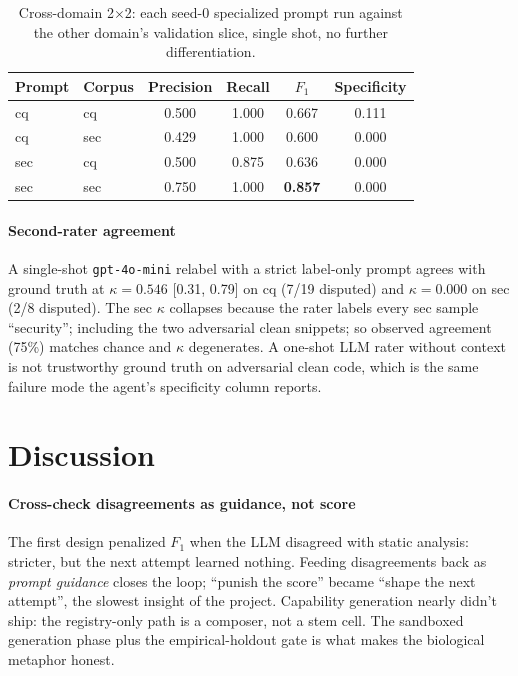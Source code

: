 \documentclass[11pt,a4paper]{article}
\begin{document}
\begin{table}[!htbp]
\small
\centering
\begin{tabular}{@{}llcccc@{}}
\toprule
\textbf{Prompt} & \textbf{Corpus} & \textbf{Precision} & \textbf{Recall} & \textbf{$F_1$} & \textbf{Specificity} \\
\midrule
cq  & cq  & 0.500 & 1.000 & 0.667 & 0.111 \\
cq  & sec & 0.429 & 1.000 & 0.600 & 0.000 \\
sec & cq  & 0.500 & 0.875 & 0.636 & 0.000 \\
sec & sec & 0.750 & 1.000 & \textbf{0.857} & 0.000 \\
\bottomrule
\end{tabular}
\caption{Cross-domain 2$\times$2: each seed-0 specialized prompt run against the other domain's validation slice, single shot, no further differentiation.}
\label{tab:cross-domain}
\end{table}

\paragraph{Second-rater agreement} A single-shot \texttt{gpt-4o-mini} relabel with a strict label-only prompt agrees with ground truth at $\kappa = 0.546$ [0.31, 0.79] on cq (7/19 disputed) and $\kappa = 0.000$ on sec (2/8 disputed). The sec $\kappa$ collapses because the rater labels every sec sample ``security''; including the two adversarial clean snippets; so observed agreement (75\%) matches chance and $\kappa$ degenerates. A one-shot LLM rater without context is not trustworthy ground truth on adversarial clean code, which is the same failure mode the agent's specificity column reports.

\section{Discussion}

\paragraph{Cross-check disagreements as guidance, not score} The first design penalized $F_1$ when the LLM disagreed with static analysis: stricter, but the next attempt learned nothing. Feeding disagreements back as \emph{prompt guidance} closes the loop; ``punish the score'' became ``shape the next attempt'', the slowest insight of the project. Capability generation nearly didn't ship: the registry-only path is a composer, not a stem cell. The sandboxed generation phase plus the empirical-holdout gate is what makes the biological metaphor honest.
\end{document}
